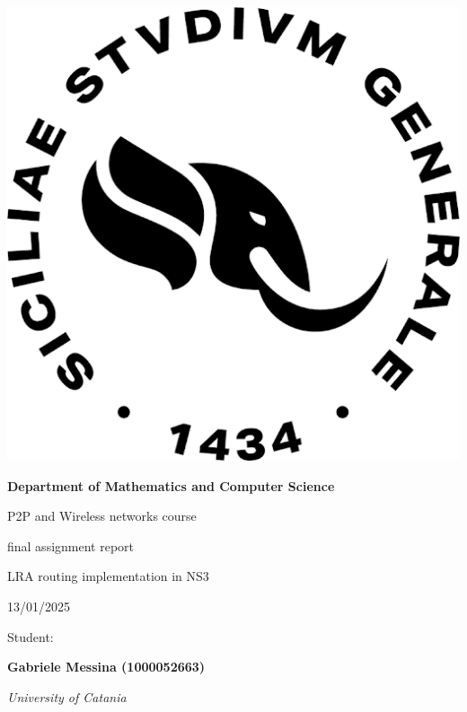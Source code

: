 \documentclass[../report.tex]{subfiles}
\begin{document}
\begin{titlepage}\centering

    \includegraphics[scale=.30]{images/logo_unict.png}
    \vspace{1cm}

    {\LARGE\bfseries Department of Mathematics and Computer Science}

    \vspace{1cm}

    {\Large  P2P and Wireless networks course}
    
    \vspace{.15cm}
    
    {\Large  final assignment report}

    \vspace{.5cm}

    {\large LRA routing implementation in NS3}
    
    \vspace{.5cm}

    {\large 13/01/2025}

    \vspace{2cm}

    {\large Student:}

    {\bfseries Gabriele Messina (1000052663)}

    \vfill

    {\itshape University of Catania}
\end{titlepage}
\end{document}
